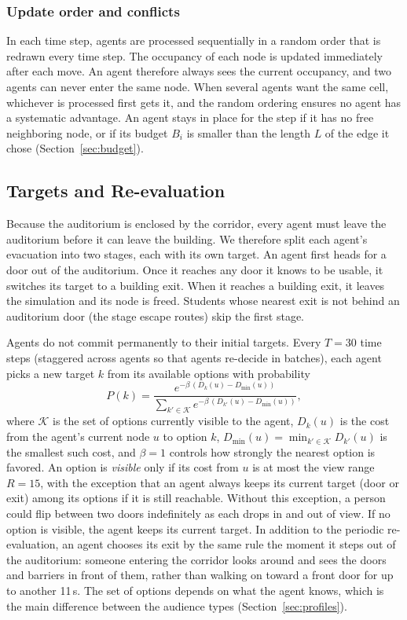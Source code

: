 \documentclass{article}
\begin{document}
\subsubsection{Update order and conflicts}
\label{sec:order}

In each time step, agents are processed sequentially in a random order that is redrawn every time step. The occupancy of each node is updated immediately after each move. An agent therefore always sees the current occupancy, and two agents can never enter the same node. When several agents want the same cell, whichever is processed first gets it, and the random ordering ensures no agent has a systematic advantage. An agent stays in place for the step if it has no free neighboring node, or if its budget $B_i$ is smaller than the length $L$ of the edge it chose (Section~\ref{sec:budget}).

\subsection{Targets and Re-evaluation}
\label{sec:targets}

Because the auditorium is enclosed by the corridor, every agent must leave the auditorium before it can leave the building. We therefore split each agent's evacuation into two stages, each with its own target. An agent first heads for a door out of the auditorium. Once it reaches any door it knows to be usable, it switches its target to a building exit. When it reaches a building exit, it leaves the simulation and its node is freed. Students whose nearest exit is not behind an auditorium door (the stage escape routes) skip the first stage.

Agents do not commit permanently to their initial targets. Every $T = 30$ time steps (staggered across agents so that agents re-decide in batches), each agent picks a new target $k$ from its available options with probability
\begin{equation}
P(k) = \frac{e^{-\beta\,\left(D_k(u) - D_{\min}(u)\right)}}{\sum_{k' \in \mathcal{K}} e^{-\beta\,\left(D_{k'}(u) - D_{\min}(u)\right)}},
\end{equation}
where $\mathcal{K}$ is the set of options currently visible to the agent, $D_k(u)$ is the cost from the agent's current node $u$ to option $k$, $D_{\min}(u) = \min_{k' \in \mathcal{K}} D_{k'}(u)$ is the smallest such cost, and $\beta = 1$ controls how strongly the nearest option is favored. An option is \emph{visible} only if its cost from $u$ is at most the view range $R = 15$, with the exception that an agent always keeps its current target (door or exit) among its options if it is still reachable. Without this exception, a person could flip between two doors indefinitely as each drops in and out of view. If no option is visible, the agent keeps its current target. In addition to the periodic re-evaluation, an agent chooses its exit by the same rule the moment it steps out of the auditorium: someone entering the corridor looks around and sees the doors and barriers in front of them, rather than walking on toward a front door for up to another 11\,s. The set of options depends on what the agent knows, which is the main difference between the audience types (Section~\ref{sec:profiles}).
\end{document}
